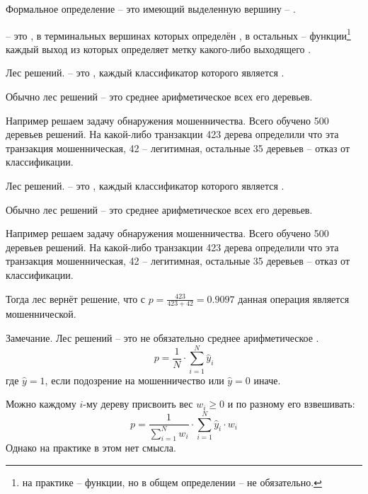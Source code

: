 \begin{frame}{Формальное определение}
	 -- это   
	имеющий выделенную вершину --  .
	
	 -- это , в терминальных вершинах которых 
	определён , в остальных  -- функции\footnote{
	на практике --  функции, но в общем определении -- не обязательно.}
	каждый выход из которых определяет метку какого-либо выходящего .
\end{frame}

\begin{frame}{Лес решений.}
	 -- это , каждый классификатор которого 
	является .
	
	Обычно лес решений -- это среднее арифметическое всех его деревьев. 
	
	Например решаем задачу обнаружения мошенничества. Всего обучено 500 деревьев решений.
	На какой-либо транзакции 423 дерева определили что эта транзакция мошенническая,
	42 -- легитимная, остальные 35 деревьев -- отказ от классификации.
	
\end{frame}

\begin{frame}{Лес решений.}
	 -- это , каждый классификатор которого 
	является .
	
	Обычно лес решений -- это среднее арифметическое всех его деревьев. 
	
	Например решаем задачу обнаружения мошенничества. Всего обучено 500 деревьев решений.
	На какой-либо транзакции 423 дерева определили что эта транзакция мошенническая,
	42 -- легитимная, остальные 35 деревьев -- отказ от классификации.
	
	Тогда лес вернёт решение, что 
	с 
	$p=\frac{423}{423+42} = 0.9097$ 
	данная операция является мошеннической.
\end{frame}

\begin{frame}
	\begin{block}{Замечание.}
	\small
	Лес решений -- это не обязательно среднее арифметическое .
	\begin{equation}\label{eq:ensemble_p}
	p = \frac{1}{N} \cdot \sum_{i=1}^{N} \hat y_i
	\end{equation}
	где $\hat y = 1$, если подозрение на мошенничество или $\hat y =0$ иначе.
	
	Можно каждому $i$-му дереву  присвоить вес $w_i \geqslant 0$ и по разному его взвешивать:
	\begin{equation*}
	p = \frac{1}{ \sum_{i=1}^{N} w_i}  \cdot \sum_{i=1}^{N} \hat y_i \cdot w_i
	\end{equation*}
	Однако на практике в этом нет смысла.
	\end{block}

\end{frame}

